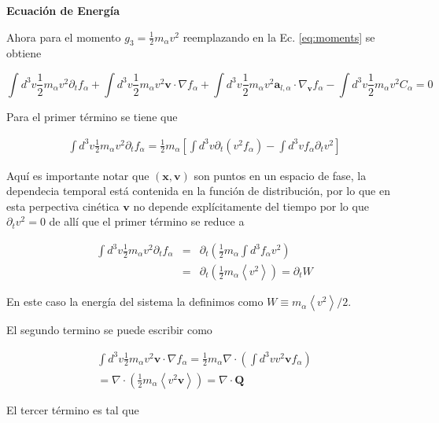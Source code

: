 \textbf{Ecuaci\'on de Energ\'ia}

Ahora para el momento $g_3 = \frac{1}{2}m_\alpha v^2$ reemplazando en la Ec. \eqref{eq:moments} se obtiene 

\begin{equation}
  \int d^3v \frac{1}{2}m_\alpha v^2 \partial_t f_\alpha + \int d^3v \frac{1}{2}m_\alpha v^2\textbf{v}\cdot\nabla f_\alpha + \int d^3v \frac{1}{2}m_\alpha v^2 \textbf{a}_{l,\alpha}\cdot\nabla_\textbf{v}f_\alpha - \int d^3v \frac{1}{2}m_\alpha v^2 C_\alpha = 0
\end{equation}

Para el primer t\'ermino se tiene que 

\begin{eqnarray*}
  \int d^3v \frac{1}{2}m_\alpha v^2\partial_tf_\alpha = \frac{1}{2}m_\alpha\left[\int d^3v \partial_t (v^2f_\alpha) - \int d^3v f_\alpha\partial_t v^2\right]
\end{eqnarray*}

Aqu\'i es importante notar que $(\textbf{x}, \textbf{v})$ son puntos en un espacio de fase, la dependecia temporal est\'a contenida en la funci\'on de distribuci\'on, por lo que en esta perpectiva cin\'etica $\textbf{v}$ no depende expl\'icitamente del tiempo por lo que $\partial_t v^2 = 0$ de all\'i que el primer t\'ermino se reduce a 

\begin{eqnarray}
  \int d^3v \frac{1}{2}m_\alpha v^2\partial_t f_\alpha &=& \partial_t \left(\frac{1}{2}m_\alpha \int d^3 f_\alpha v^2 \right) \nonumber\\
  &=& \partial_t\left(\frac{1}{2}m_\alpha \left<v^2\right>\right) = \partial_t W
  \end{eqnarray}

En este caso la energ\'ia del sistema la definimos como $W \equiv m_\alpha \left<v^2\right>/2$.

El segundo termino se puede escribir como 

\begin{eqnarray}
  \int d^3v \frac{1}{2}m_\alpha v^2\textbf{v}\cdot\nabla f_\alpha = \frac{1}{2}m_\alpha\nabla\cdot\left(\int d^3v v^2\textbf{v}f_\alpha\right) \nonumber \\
  = \nabla\cdot \left(\frac{1}{2}m_\alpha\left<v^2\textbf{v}\right>\right) = \nabla\cdot\textbf{Q}
\end{eqnarray}

El tercer t\'ermino es tal que 

